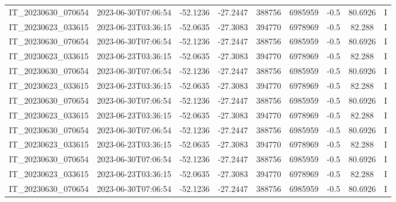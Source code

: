 \begin{small}
\begin{longtable}{ccccccccc}
IT\_20230630\_070654 & 2023-06-30T07:06:54 & -52.1236 & -27.2447 & 388756 & 6985959 & -0.5 & \num[round-precision=3,round-mode=figures,scientific-notation=true]{80.6926} & I \\
IT\_20230623\_033615 & 2023-06-23T03:36:15 & -52.0635 & -27.3083 & 394770 & 6978969 & -0.5 & \num[round-precision=3,round-mode=figures,scientific-notation=true]{82.288} & I \\
IT\_20230630\_070654 & 2023-06-30T07:06:54 & -52.1236 & -27.2447 & 388756 & 6985959 & -0.5 & \num[round-precision=3,round-mode=figures,scientific-notation=true]{80.6926} & I \\
IT\_20230623\_033615 & 2023-06-23T03:36:15 & -52.0635 & -27.3083 & 394770 & 6978969 & -0.5 & \num[round-precision=3,round-mode=figures,scientific-notation=true]{82.288} & I \\
IT\_20230630\_070654 & 2023-06-30T07:06:54 & -52.1236 & -27.2447 & 388756 & 6985959 & -0.5 & \num[round-precision=3,round-mode=figures,scientific-notation=true]{80.6926} & I \\
IT\_20230623\_033615 & 2023-06-23T03:36:15 & -52.0635 & -27.3083 & 394770 & 6978969 & -0.5 & \num[round-precision=3,round-mode=figures,scientific-notation=true]{82.288} & I \\
IT\_20230630\_070654 & 2023-06-30T07:06:54 & -52.1236 & -27.2447 & 388756 & 6985959 & -0.5 & \num[round-precision=3,round-mode=figures,scientific-notation=true]{80.6926} & I \\
IT\_20230623\_033615 & 2023-06-23T03:36:15 & -52.0635 & -27.3083 & 394770 & 6978969 & -0.5 & \num[round-precision=3,round-mode=figures,scientific-notation=true]{82.288} & I \\
IT\_20230630\_070654 & 2023-06-30T07:06:54 & -52.1236 & -27.2447 & 388756 & 6985959 & -0.5 & \num[round-precision=3,round-mode=figures,scientific-notation=true]{80.6926} & I \\
IT\_20230623\_033615 & 2023-06-23T03:36:15 & -52.0635 & -27.3083 & 394770 & 6978969 & -0.5 & \num[round-precision=3,round-mode=figures,scientific-notation=true]{82.288} & I \\
IT\_20230630\_070654 & 2023-06-30T07:06:54 & -52.1236 & -27.2447 & 388756 & 6985959 & -0.5 & \num[round-precision=3,round-mode=figures,scientific-notation=true]{80.6926} & I \\
IT\_20230623\_033615 & 2023-06-23T03:36:15 & -52.0635 & -27.3083 & 394770 & 6978969 & -0.5 & \num[round-precision=3,round-mode=figures,scientific-notation=true]{82.288} & I \\
IT\_20230630\_070654 & 2023-06-30T07:06:54 & -52.1236 & -27.2447 & 388756 & 6985959 & -0.5 & \num[round-precision=3,round-mode=figures,scientific-notation=true]{80.6926} & I \\

\end{longtable}
\end{small}
